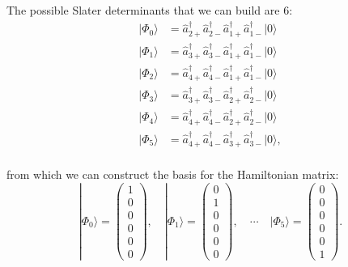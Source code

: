 \documentclass[twoside]{article}
\newcommand{\ket}[1]{| #1 \rangle}
\begin{document}
The possible Slater determinants that we can build are 6:
\begin{align*}
\ket{\Phi_0} &= \hat a_{2+}^\dagger \hat a_{2-}^\dagger \hat a_{1+}^\dagger \hat a_{1-}^\dagger \ket{0}  \\
%
\ket{\Phi_1} &= \hat a_{3+}^\dagger \hat a_{3-}^\dagger \hat a_{1+}^\dagger \hat a_{1-}^\dagger \ket{0}  \\
%
\ket{\Phi_2} &= \hat a_{4+}^\dagger \hat a_{4-}^\dagger \hat a_{1+}^\dagger \hat a_{1-}^\dagger \ket{0}  \\
%
\ket{\Phi_3} &= \hat a_{3+}^\dagger \hat a_{3-}^\dagger \hat a_{2+}^\dagger \hat a_{2-}^\dagger \ket{0}  \\
%
\ket{\Phi_4} &= \hat a_{4+}^\dagger \hat a_{4-}^\dagger \hat a_{2+}^\dagger \hat a_{2-}^\dagger \ket{0}  \\
%
\ket{\Phi_5} &= \hat a_{4+}^\dagger \hat a_{4-}^\dagger \hat a_{3+}^\dagger \hat a_{3-}^\dagger \ket{0} , \\
\end{align*}

from which we can construct the basis for the Hamiltonian matrix:
\[ \ket{\Phi_0} = \begin{pmatrix} 1 \\ 0 \\ 0 \\ 0 \\ 0 \\ 0 \end{pmatrix}, \quad
\ket{\Phi_1} = \begin{pmatrix} 0 \\ 1 \\ 0 \\ 0 \\ 0 \\ 0 \end{pmatrix}, \quad \cdots \quad
\ket{\Phi_5} = \begin{pmatrix} 0 \\ 0 \\ 0 \\ 0 \\ 0 \\ 1 \end{pmatrix}. \]
\end{document}
